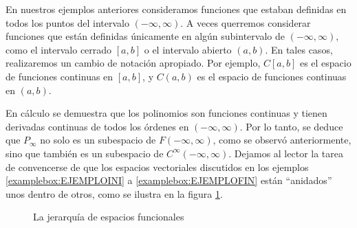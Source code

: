 En nuestros ejemplos anteriores consideramos funciones que estaban definidas en todos los puntos del intervalo $(-\infty, \infty)$. A veces querremos considerar funciones que están definidas únicamente en algún subintervalo de $(-\infty, \infty)$, como el intervalo cerrado $[a, b]$ o el intervalo abierto $(a, b)$. En tales casos, realizaremos un cambio de notación apropiado. Por ejemplo, $C[a, b]$ es el espacio de funciones continuas en $[a, b]$, y $C(a, b)$ es el espacio de funciones continuas en $(a, b)$.

\newpage

En cálculo se demuestra que los polinomios son funciones continuas y tienen derivadas continuas de todos los órdenes en $(-\infty, \infty)$. Por lo tanto, se deduce que $P_\infty$ no solo es un subespacio de $F(-\infty, \infty)$, como se observó anteriormente, sino que también es un subespacio de $C^\infty(-\infty, \infty)$. Dejamos al lector la tarea de convencerse de que los espacios vectoriales discutidos en los ejemplos \ref{examplebox:EJEMPLOINI} a \ref{examplebox:EJEMPLOFIN} están “anidados” unos dentro de otros, como se ilustra en la figura \ref{JAJAIQPAPOAOSOOAKJS}.
\begin{figure}[H]
    \centering
    \caption{La jerarquía de espacios funcionales}
    \label{JAJAIQPAPOAOSOOAKJS}
\end{figure}

